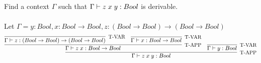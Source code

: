 \subsection{}

Find a context $\Gamma$ such that $\Gamma \vdash z\;x\;y: Bool$ is
derivable.\\~\\
Let $\Gamma = y: Bool, x: Bool \to Bool, z: (Bool \to Bool) \to (Bool \to Bool)$
\begin{align*}
	\infer[\text{\small{T-APP}}]
	{
		\Gamma \vdash \APP{\APP{z}{x}}{y}: Bool
	}
	{
		\infer[\text{\small{T-APP}}]
		{\Gamma \vdash \APP{z}{x} : Bool \to Bool}
	{ \infer[\text{\small{T-VAR}}]{\Gamma \vdash z : (Bool \to Bool) \to (Bool \to Bool)}{} &
			\infer[\text{\small{T-VAR}}]{ \Gamma \vdash x : Bool \to Bool}{}
	}                                                                                       &
		\infer[\text{\small{T-VAR}}]{\Gamma \vdash y : Bool}{}
	}
\end{align*}
